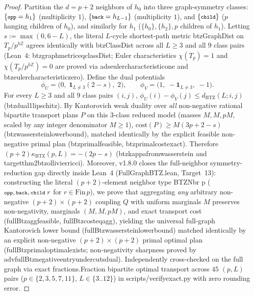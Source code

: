 \documentclass[11pt,a4paper]{article}
\numberwithin{equation}{section}
\theoremstyle{plain}
\theoremstyle{definition}
\theoremstyle{remark}
\newcommand{\Z}{\mathbb{Z}}
\newcommand{\Tp}{T_p}
\newcommand{\code}[1]{{\ttfamily\footnotesize\def\_{\textunderscore\penalty0\hskip0pt}#1}}
\begin{document}
\begin{proof}
Partition the $d = p + 2$ neighbors of $h_0$ into three graph-symmetry classes: $\{\text{\code{opp}} = h_1\}$ (multiplicity $1$), $\{\text{\code{back}} = h_{L-1}\}$ (multiplicity $1$), and $\{\text{\code{child}}\}$ ($p$ hanging children of $h_0$), and similarly for $h_1$ ($\{h_0\}, \{h_2\}, p$ children of $h_1$). Letting $s := \max(0, 6 - L)$, the literal $L$-cycle shortest-path metric \code{btzGraphDist} on $\Tp / p^{h\Z}$ agrees identically with \code{btzClassDist} across all $L \ge 3$ and all $9$ class pairs (Lean~4: \code{btz\_graph\_metric\_eq\_classDist}; Euler characteristics $\chi(\Tp) = 1$ and $\chi(\Tp/p^{h\Z}) = 0$ are proved via \code{ads\_euler\_characteristic\_one} and \code{btz\_euler\_characteristic\_zero}). Define the dual potentials
\[
  \phi_U = \bigl(0,\; \mathbf{1}_{L \ne 3}(2 - s),\; 2\bigr), \qquad
  \phi_V = \bigl(1,\; -\mathbf{1}_{L \ne 3},\; -1\bigr).
\]
For every $L \ge 3$ and all $9$ class pairs $(i, j)$, $\phi_U(i) - \phi_V(j) \le d_{\mathrm{BTZ}}(L; i, j)$ (\code{btz\_dual\_1lipschitz}). By Kantorovich weak duality over \emph{all} non-negative rational bipartite transport plans $P$ on this $3$-class reduced model (masses $M, M, pM$, scaled by any integer denominator $M \ge 1$), $\mathrm{cost}(P) \ge M(3p + 2 - s)$ (\code{btz\_wasserstein\_lower\_bound}), matched identically by the explicit feasible non-negative primal plan (\code{btz\_primal\_feasible}, \code{btz\_primal\_cost\_exact}). Therefore $(p + 2)\kappa_{\mathrm{BTZ}}(p, L) = -(2p - s)$ (\code{btz\_kappa\_from\_wasserstein} and \code{target\_thm2\_btz\_ollivier\_ricci}). Moreover, \code{v1.8.0} closes the full-neighbor symmetry-reduction gap directly inside Lean~4 (\code{FullGraphBTZ.lean}, Target~13): constructing the literal $(p+2)$-element neighbor type \code{BTZNbr p} ($\text{\code{opp}}, \text{\code{back}}, \text{\code{child}}\; r$ for $r \in \mathrm{Fin}\,p$), we prove that aggregating \emph{any} arbitrary non-negative $(p+2)\times(p+2)$ coupling $Q$ with uniform marginals $M$ preserves non-negativity, marginals $(M, M, pM)$, and exact transport cost (\code{fullBtz\_\allowbreak agg\_\allowbreak feasible}, \code{fullBtz\_\allowbreak cost\_\allowbreak eq\_\allowbreak agg}), yielding the universal full-graph Kantorovich lower bound (\code{fullBtz\_\allowbreak wasserstein\_\allowbreak lower\_\allowbreak bound}) matched identically by an explicit non-negative $(p+2)\times(p+2)$ primal optimal plan (\code{fullBtz\_\allowbreak primal\_\allowbreak optimal\_\allowbreak exists}; non-negativity sharpness proved by \code{adv\_\allowbreak fullBtz\_\allowbreak negative\_\allowbreak entry\_\allowbreak undercuts\_\allowbreak dual}). Independently cross-checked on the full graph via exact \code{fractions.Fraction} bipartite optimal transport across $45$ $(p, L)$ pairs ($p \in \{2,3,5,7,11\}$, $L \in \{3..12\}$) in \code{scripts/verify\_exact.py} with zero rounding error.
\end{proof}
\end{document}
